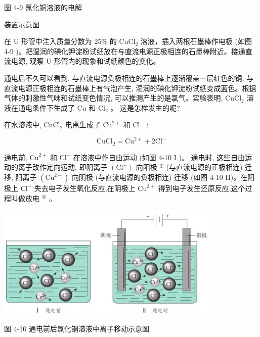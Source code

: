 \documentclass[10pt]{article}
\begin{document}
图 4-9 氯化铜溶液的电解

装置示意图

在 \(\mathrm{U}\) 形管中注入质量分数为 \({25}\%\) 的 \({\mathrm{{CuCl}}}_{2}\) 溶液，插入两根石墨棒作电极 (如图 4-9 )。把湿润的碘化钾淀粉试纸放在与直流电源正极相连的石墨棒附近。接通直流电源, 观察 \(\mathrm{U}\) 形管内的现象和试纸颜色的变化。

通电后不久可以看到, 与直流电源负极相连的石墨棒上逐渐覆盖一层红色的铜, 与直流电源正极相连的石墨棒上有气泡产生, 湿润的碘化钾淀粉试纸变成蓝色。根据气体的刺激性气味和试纸变色情况, 可以推测产生的是氯气。实验表明, \({\mathrm{{CuCl}}}_{2}\) 溶液在通电条件下生成了 \(\mathrm{{Cu}}\) 和 \({\mathrm{{Cl}}}_{2}\) 。 这是怎样发生的呢?

在水溶液中, \({\mathrm{{CuCl}}}_{2}\) 电离生成了 \({\mathrm{{Cu}}}^{2 + }\) 和 \({\mathrm{{Cl}}}^{ - }\) :

\[
{\mathrm{{CuCl}}}_{2} = {\mathrm{{Cu}}}^{2 + } + 2{\mathrm{{Cl}}}^{ - }
\]

通电前, \({\mathrm{{Cu}}}^{2 + }\) 和 \({\mathrm{{Cl}}}^{ - }\) 在溶液中作自由运动 (如图 4-10 I )。 通电时, 这些自由运动的离子改作定向运动, 即阴离子 \(\left( {\mathrm{{Cl}}}^{ - }\right)\) 向阳极 \({}^{ \oplus }\) (与直流电源的正极相连) 迁移, 阳离子 \(\left( {\mathrm{{Cu}}}^{2 + }\right)\) 向阴极 (与直流电源的负极相连) 迁移 (如图 4-10 II)。在阳极上 \({\mathrm{{Cl}}}^{ - }\) 失去电子发生氧化反应,在阴极上 \({\mathrm{{Cu}}}^{2 + }\) 得到电子发生还原反应,这个过程叫做放电 \({}^{\text{①}}\) 。


\begin{center}
\includegraphics[max width=0.8\textwidth]{images/0190da9d-8bfd-732f-bc2c-0b21d0f13b91_110_124909.jpg}
\end{center}

图 4-10 通电前后氯化铜溶液中离子移动示意图
\end{document}
